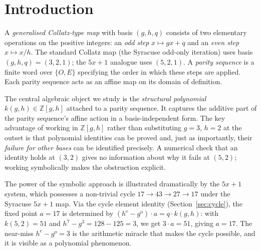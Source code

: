 \documentclass[12pt]{article}
\theoremstyle{definition}
\theoremstyle{remark}
\newcommand{\ZZ}{\mathbb{Z}}
\newcommand{\kpoly}{k}
\begin{document}
\tableofcontents

\bigskip

\section{Introduction}
\label{sec:intro}

A \emph{generalised Collatz-type map} with basis $(g,h,q)$ consists of two
elementary operations on the positive integers: an \emph{odd step}
$x \mapsto gx + q$ and an \emph{even step} $x \mapsto x/h$.  The standard
Collatz map (the Syracuse odd-only iteration) uses basis $(g,h,q) = (3,2,1)$;
the $5x+1$ analogue uses $(5,2,1)$.  A \emph{parity sequence} is a finite
word over $\{O, E\}$ specifying the order in which these steps are applied.
Each parity sequence acts as an affine map on its domain of definition.

The central algebraic object we study is the \emph{structural polynomial}
$\kpoly(g,h) \in \ZZ[g,h]$ attached to a parity sequence.  It captures the
additive part of the parity sequence's affine action in a basis-independent
form.  The key advantage of working in $\ZZ[g,h]$ rather than substituting
$g = 3$, $h = 2$ at the outset is that polynomial identities can be proved
and, just as importantly, their \emph{failure for other bases} can be
identified precisely.  A numerical check that an identity holds at $(3,2)$
gives no information about why it fails at $(5,2)$; working symbolically
makes the obstruction explicit.

The power of the symbolic approach is illustrated dramatically by the $5x+1$
system, which possesses a non-trivial cycle $17 \to 43 \to 27 \to 17$ under
the Syracuse $5x+1$ map.  Via the cycle element identity (Section~\ref{sec:cycle}),
the fixed point $a = 17$ is determined by
$(h^e - g^o)\cdot a = q\cdot\kpoly(g,h)$: with $\kpoly(5,2) = 51$ and
$h^7 - g^3 = 128 - 125 = 3$, we get $3 \cdot a = 51$, giving $a = 17$.  The near-miss
$h^e - g^o = 3$ is the arithmetic miracle that makes the cycle possible, and
it is visible as a polynomial phenomenon.
\end{document}
